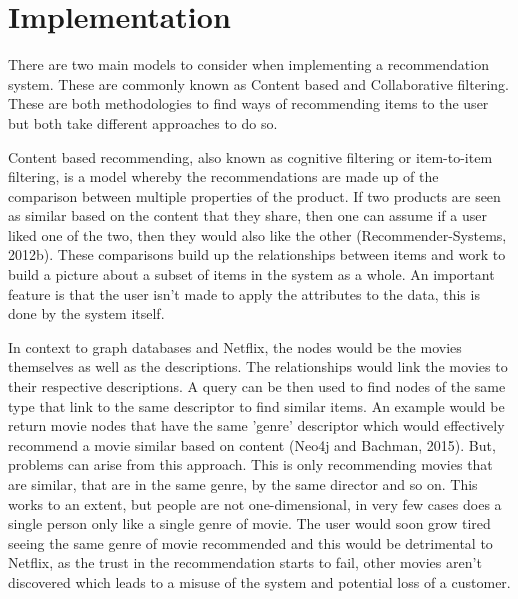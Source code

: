 \documentclass[a4paper]{article}
\begin{document}
\section{Implementation}
\label{sec:Implementation}

There are two main models to consider when implementing a recommendation system. These are commonly known as Content based and Collaborative filtering. These are both methodologies to find ways of recommending items to the user but both take different approaches to do so.

Content based recommending, also known as cognitive filtering or item-to-item filtering, is a model whereby the recommendations are made up of the comparison between multiple properties of the product. If two products are seen as similar based on the content that they share, then one can assume if a user liked one of the two, then they would also like the other (Recommender-Systems, 2012b). These comparisons build up the relationships between items and work to build a picture about a subset of items in the system as a whole. An important feature is that the user isn't made to apply the attributes to the data, this is done by the system itself.

In context to graph databases and Netflix, the nodes would be the movies themselves as well as the descriptions. The relationships would link the movies to their respective descriptions. A query can be then used to find nodes of the same type that link to the same descriptor to find similar items. An example would be return movie nodes that have the same 'genre' descriptor which would effectively recommend a movie similar based on content (Neo4j and Bachman, 2015). But, problems can arise from this approach. This is only recommending movies that are similar, that are in the same genre, by the same director and so on. This works to an extent, but people are not one-dimensional, in very few cases does a single person only like a single genre of movie. The user would soon grow tired seeing the same genre of movie recommended and this would be detrimental to Netflix, as the trust in the recommendation starts to fail, other movies aren't discovered which leads to a misuse of the system and potential loss of a customer.
\end{document}
